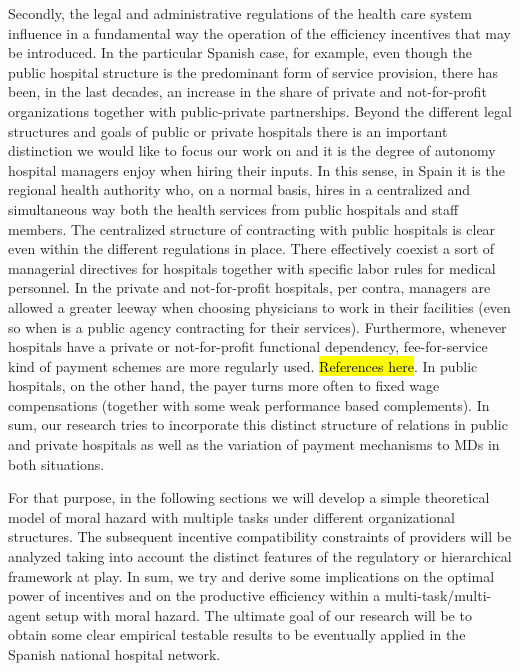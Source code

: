 \documentclass[12pt,letterpaper]{article}
\begin{document}
Secondly, the legal and administrative regulations of the health care system influence in a fundamental way the operation of the efficiency incentives that may be introduced. In the particular Spanish case, for example, even though the public hospital structure is the predominant form of service provision,  there has been, in the last decades, an increase in the share of private and not-for-profit organizations together with public-private partnerships. Beyond the different legal structures and goals of public or private hospitals there is an important distinction  we would like to focus our work on and it is the degree of autonomy hospital managers enjoy when hiring their inputs. In this sense, in Spain it is the regional health authority who, on a normal basis, hires in a centralized and simultaneous way both the health services from public hospitals and staff members. The centralized structure of contracting with public hospitals is clear even within the different regulations in place. There effectively coexist a sort of managerial directives for hospitals together with specific labor rules for medical personnel. In the private and not-for-profit hospitals, per contra, managers are allowed a greater leeway when choosing physicians to work in their facilities (even so when is a public agency contracting for their services). Furthermore, whenever hospitals have a private or not-for-profit functional dependency, fee-for-service kind of payment schemes are more regularly used. \hl{References here}. In public hospitals, on the other hand,  the payer turns more often to fixed wage compensations (together with some weak performance based complements). In sum, our research tries to incorporate this distinct structure of relations in public and private hospitals as well as the variation of payment mechanisms to MDs in both situations.

For that purpose, in the following sections we will develop a simple theoretical model of moral hazard with multiple tasks under different organizational structures. The subsequent incentive compatibility constraints of providers will be analyzed taking into account the distinct features of the regulatory or hierarchical framework at play. In sum, we try and derive some implications on the optimal power of incentives and on the productive efficiency within a multi-task/multi-agent setup with moral hazard. The ultimate goal of our research will be to obtain some clear empirical  testable results to be eventually applied in the Spanish national hospital network.
\end{document}
